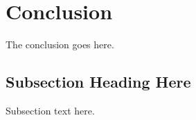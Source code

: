 \documentclass[10pt,journal,compsoc]{IEEEtran}
\begin{document}
%






\section{Conclusion}
The conclusion goes here.

\subsection{Subsection Heading Here}
Subsection text here.

\end{document}
